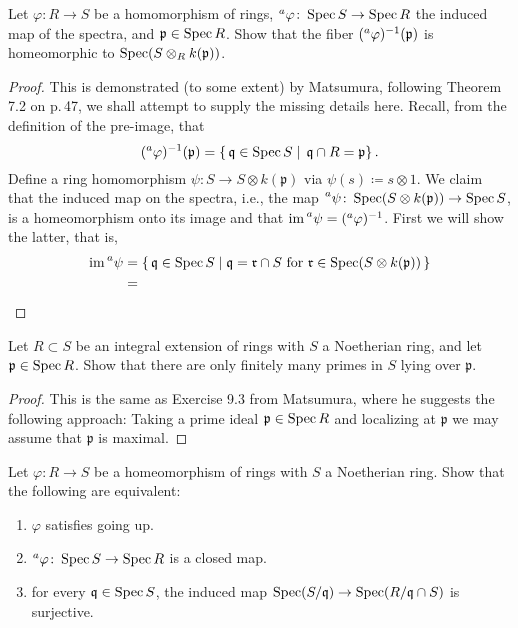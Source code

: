 \begin{problem}
Let $\varphi\colon R\to S$ be a homomorphism of rings,
$\prescript{a}{}{\varphi}\colon \operatorname{Spec} S\to\operatorname{Spec} R$ the induced map of the
spectra, and $\mathfrak{p}\in\operatorname{Spec} R$. Show that the fiber
$(\prescript{a}{}{\varphi})^{-1}(\mathfrak{p})$ is homeomorphic to
$\operatorname{Spec}(S\otimes_R k(\mathfrak{p}))$.
\end{problem}
\begin{proof}
This is demonstrated (to some extent) by Matsumura, following Theorem 7.2
on p.\,47, we shall attempt to supply the missing details
here. Recall, from the definition of the pre-image, that
\[
(\prescript{a}{}{\varphi})^{-1}(\mathfrak{p})=
\left\{\,\mathfrak{q}\in\operatorname{Spec} S\;\middle|\;\,\mathfrak{q}\cap R=\mathfrak{p}\right\}.
\]
Define a ring homomorphism $\psi\colon S\to S\otimes
k(\mathfrak{p})$ via $\psi(s)\coloneqq s\otimes 1$. We claim that
the induced map on the spectra, i.e., the map
$\prescript{a}{}{\psi}\colon\operatorname{Spec}(S\otimes
k(\mathfrak{p}))\to\operatorname{Spec} S$, is a homeomorphism onto its image
and that
$\operatorname{im}\prescript{a}{}{\psi}=(\prescript{a}{}{\varphi})^{-1}$. First
we will show the latter, that is,
\begin{align*}
\operatorname{im}\prescript{a}{}{\psi}
&=\left\{\,\mathfrak{q}\in\operatorname{Spec}
  S\;\middle|\;\text{$\mathfrak{q}=\mathfrak{r}\cap S$ for
  $\mathfrak{r}\in\operatorname{Spec}(S\otimes k(\mathfrak{p}))$}\,\right\}\\
&=
\end{align*}
\end{proof}
\newpage
\begin{problem}
Let $R\subset S$ be an integral extension of rings with $S$ a Noetherian
ring, and let $\mathfrak{p}\in\operatorname{Spec} R$. Show that there are only finitely
many primes in $S$ lying over $\mathfrak{p}$.
\end{problem}
\begin{proof}
This is the same as Exercise 9.3 from Matsumura, where he
suggests the following approach: Taking a prime ideal
$\mathfrak{p}\in\operatorname{Spec} R$ and localizing at $\mathfrak{p}$ we may
assume that $\mathfrak{p}$ is maximal.
\end{proof}
\newpage
\begin{problem}
Let $\varphi\colon R\to S$ be a homeomorphism of rings with $S$ a
Noetherian ring. Show that the following are equivalent:
\begin{enumerate}[label=(\roman*)]
\item $\varphi$ satisfies going up.
\item $\prescript{a}{}\varphi\colon\operatorname{Spec} S\to\operatorname{Spec} R$ is a closed map.
\item for every $\mathfrak{q}\in\operatorname{Spec} S$, the induced map
  $\operatorname{Spec}(S/\mathfrak{q})\to\operatorname{Spec}(R/\mathfrak{q}\cap S)$ is surjective.
\end{enumerate}
\end{problem}
